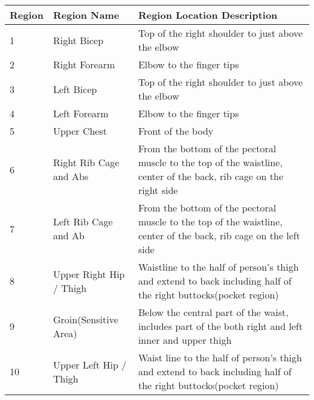 \documentclass[conference,compsoc]{IEEEtran}
\begin{document}
	\begin{table}[h]
	\centering
	\begin{tabular}{|p{1cm}|p{1.5cm}|p{4.5cm}|}
	\toprule
	\multicolumn{1}{|c|}{Region} & Region Name             & Region Location Description                                                                                        \\ \midrule
	1                            & Right Bicep             & Top of the right shoulder to just above the elbow                                                                  \\ \midrule
	2                            & Right Forearm           & Elbow to the finger tips                                                                                           \\ \midrule
	3                            & Left Bicep              & Top of the right shoulder to just above the elbow                                                                  \\ \midrule
	4                            & Left Forearm            & Elbow to the finger tips                                                                                           \\ \midrule
	5                            & Upper Chest             & Front of the body                                                                                                  \\ \midrule
	6                            & Right Rib Cage and Abs  & From the bottom of the pectoral muscle to the top of the waistline, center of the back, rib cage on the right side \\ \midrule
	7                            & Left Rib Cage and Ab    & From the bottom of the pectoral muscle to the top of the waistline, center of the back, rib cage on the left side  \\ \midrule
	8                            & Upper Right Hip / Thigh & Waistline to the half of person's thigh and extend to back including half of the right buttocks(pocket region)     \\ \midrule
	9                            & Groin(Sensitive Area)   & Below the central part of the waist, includes part of the both right and left inner and upper thigh                \\ \midrule
	10                           & Upper Left Hip / Thigh  & Waist line to the half of person's thigh and extend to back including half of the right buttocks(pocket region)    \\ \midrule

\end{tabular}
\end{table}
\end{document}
